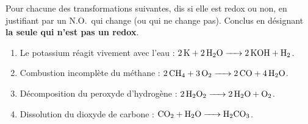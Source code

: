 \documentclass[11pt,a4paper]{article}
\newcommand{\NO}{\ensuremath{\mathrm{N.O.}}}
\newcounter{exo}
\begin{document}
\begin{exo}
Pour chacune des transformations suivantes, dis si elle est redox ou non, en justifiant par un \NO\
qui change (ou qui ne change pas). Conclus en désignant \textbf{la seule qui n'est pas un redox}.
\begin{enumerate}[label=\textbf{\Alph*.},leftmargin=2.2em,topsep=2pt,itemsep=2pt]
  \item Le potassium réagit vivement avec l'eau : $\ce{2 K + 2 H2O -> 2 KOH + H2}$.
  \item Combustion incomplète du méthane : $\ce{2 CH4 + 3 O2 -> 2 CO + 4 H2O}$.
  \item Décomposition du peroxyde d'hydrogène : $\ce{2 H2O2 -> 2 H2O + O2}$.
  \item Dissolution du dioxyde de carbone : $\ce{CO2 + H2O -> H2CO3}$.
\end{enumerate}
\end{exo}
\end{document}
